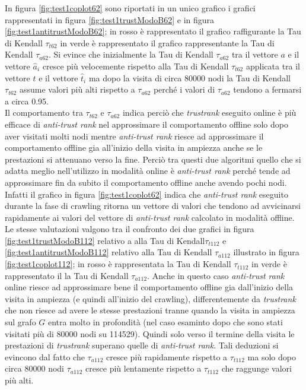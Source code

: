 In figura \ref{fig:test1coplot62} sono riportati in un unico grafico i grafici rappresentati in figura \ref{fig:test1trustModoB62}  e in figura \ref{fig:test1antitrustModoB62}; in rosso è rappresentato il grafico raffigurante la Tau di Kendall \(\tau_{t62}\) in verde è rappresentato il grafico  rappresentante la Tau di Kendall \(\tau_{a62}\). Si evince che inizialmente la Tau di Kendall \(\tau_{a62}\) tra il vettore \(a\) e il vettore \(\hat{a}_i\) cresce più velocemente rispetto alla Tau di Kendall \(\tau_{t62}\) applicata  tra il vettore \(t\) e il vettore \(\hat{t}_i\) ma dopo la visita di circa 80000 nodi la Tau di Kendall \(\tau_{t62}\) assume valori più alti rispetto a \(\tau_{a62}\) perché i valori di \(\tau_{a62}\) tendono a fermarsi a circa 0.95.\\
Il comportamento tra \(\tau_{t62}\) e \(\tau_{a62}\) indica perciò che \textit{trustrank} eseguito online è più efficace di \textit{anti-trust rank} nel approssimare il comportamento offline solo dopo aver  visitati molti nodi mentre \textit{anti-trust rank} riesce ad approssimare  il comportamento  offline gia all'inizio della visita in ampiezza anche se le prestazioni si attenuano verso la fine. Perciò tra questi due algoritmi quello che si adatta meglio nell'utilizzo in modalità online è \textit{anti-trust rank} perché tende ad approssimare fin da subito il comportamento offline anche avendo pochi nodi. Infatti il grafico in figura \ref{fig:test1coplot62} indica che \textit{anti-trust rank} eseguito durante la fase di crawling ritorna un vettore di valori che tendono ad avvicinarsi rapidamente ai valori del vettore di \textit{anti-trust rank} calcolato in modalità offline.\\
Le stesse valutazioni valgono tra il confronto dei due grafici in figura \ref{fig:test1trustModoB112} relativo a alla Tau di Kendall\(\tau_{t112}\) e \ref{fig:test1antitrustModoB112}  relativo alla Tau di Kendall \(\tau_{a112}\) illustrato in figura \ref{fig:test1coplot112}; in rosso è rappresentata la Tau di Kendall \(\tau_{t112}\) in verde è rappresentato il la Tau di Kendall \(\tau_{a112}\). Anche in questo caso \textit{anti-trust rank} online riesce ad approssimare bene  il comportamento offline gia dall'inizio della visita in ampiezza (e quindi all'inizio del crawling), differentemente da \textit{trustrank} che non riesce ad avere le stesse prestazioni tranne quando la visita in ampiezza sul grafo \(G\) entra molto in profondità (nel caso esaminto dopo che sono stati visitati più di 80000 nodi su 114529). Quindi solo verso il termine della visita le prestazioni di \textit{trustrank} superano quelle di \textit{anti-trust rank}. Tali deduzioni si evincono dal fatto che \(\tau_{a112}\) cresce più rapidamente rispetto a \(\tau_{t112}\) ma solo dopo circa 80000 nodi \(\tau_{a112}\) cresce più lentamente rispetto a \(\tau_{
t112}\) che raggunge valori più alti.



